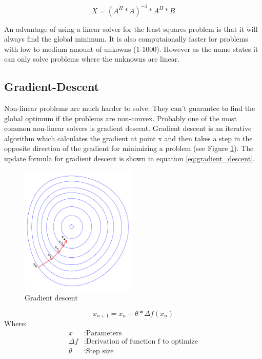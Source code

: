 \documentclass[11pt,a4paper,titlepage,oneside]{report}
\begin{document}
\begin{equation}\label{eq:least_squares_algorithm}
  X=(A^H*A)^{-1}*A^H*B 
\end{equation}

An advantage of using a linear solver for the least squares problem is that it will always find the global minimum. It is also computaionally faster for problems with low to medium amount of unkowns (1-1000). However as the name states it can only solve problems where the unknowns are linear.

\subsection{Gradient-Descent}
Non-linear problems are much harder to solve. They can't guarantee to find the global optimum if the problems are non-convex. Probably one of the most common non-linear solvers is gradient descent. Gradient descent is an iterative algorithm which calculates the gradient at point x and then takes a step in the opposite direction of the gradient for minimizing a problem (see Figure \ref{fig:gradient_descent}). The update formula for gradient descent is shown in equation \ref{eq:gradient_descent}.
\begin{figure}[H]
  \begin{center}
    \includegraphics[width=0.5\textwidth]{img/gradient_descent.png}
  \end{center}
    \caption{Gradient descent}\label{fig:gradient_descent}
\end{figure}

\begin{equation}\label{eq:gradient_descent}
  x_{n+1}=x_n-\theta*\Delta f(x_n)
\end{equation}
Where:
\begin{align*}
  x		      &: \text{Parameters}\\
  \Delta f  &: \text{Derivation of function f to optimize}\\
  \theta    &: \text{Step size}
\end{align*}
\end{document}
